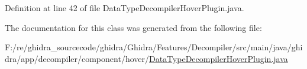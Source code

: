 Definition at line 42 of file Data\+Type\+Decompiler\+Hover\+Plugin.\+java.



The documentation for this class was generated from the following file\+:\begin{DoxyCompactItemize}
\item 
F\+:/re/ghidra\+\_\+sourcecode/ghidra/\+Ghidra/\+Features/\+Decompiler/src/main/java/ghidra/app/decompiler/component/hover/\mbox{\hyperlink{_data_type_decompiler_hover_plugin_8java}{Data\+Type\+Decompiler\+Hover\+Plugin.\+java}}\end{DoxyCompactItemize}
